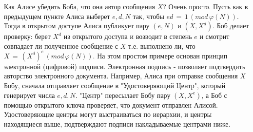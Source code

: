 Как Алисе убедить Боба, что она автор сообщения $X$? Очень просто. Пусть как в предыдущем пункте Алиса выберет $e, d, N$ так, чтобы $ed \, = \,1 \,(mod \, \varphi (N))$. Тогда в открытом доступе Алиса публикует пару $(e, N)$ и  $(X, X^d)$. Боб делает проверку: берет $X^d$ из открытого доступа и возводит в степень $e$ и смотрит совпадает ли полученное сообщение с $X$  т.е. выполнено ли, что $X \, = \, (X^d)^e \, (mod \, \varphi (N))$. На этом простом примере основан принцип электронной (цифровой) подписи. Электронная подпись - позволяет подтвердить авторство электронного документа. Например, Алиса при отправке сообщения $X$ Бобу, сначала отправляет сообщение в "Удостоверяющий Центр", который генерирует числа $e, d, N$. "Центр" пересылает Бобу пару $(X, X^e)$, а Боб с помощью открытого ключа проверяет, что документ отправлен Алисой. Удостоверяющие центры могут выстраиваться по иерархии, и центры находящиеся выше, подтверждают подписи накладываемые центрами ниже.





